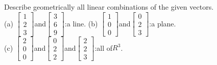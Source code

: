 \documentclass{article}
\begin{document}
\section{}
Describe geometrically all linear combinations of the given vectors.
\\(a) $\begin{bmatrix}
    1\\2\\3
\end{bmatrix}$and$\begin{bmatrix}
    3\\6\\9
\end{bmatrix}$:a line.
(b) $\begin{bmatrix}
    1\\0\\0
\end{bmatrix}$and$\begin{bmatrix}
    0\\2\\3
\end{bmatrix}$:a plane.
\\(c) $\begin{bmatrix}
    2\\0\\0
\end{bmatrix}$and$\begin{bmatrix}
    0\\2\\2
\end{bmatrix}$and$\begin{bmatrix}
    2\\2\\3
\end{bmatrix}$:all of$R^3$.
\end{document}
